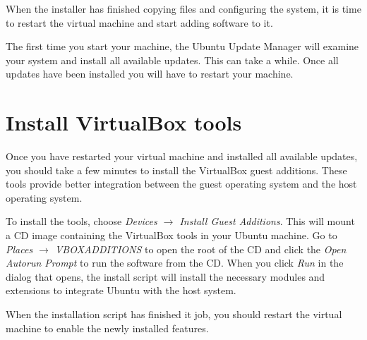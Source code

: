 \documentclass[draft,ebook,10pt,twoside,openright]{memoir}
\begin{document}

When the installer has finished copying files and configuring the system, it is time to restart the virtual machine and start adding software to it.

The first time you start your machine, the Ubuntu Update Manager will examine your system and install all available updates. This can take a while. Once all updates have been installed you will have to restart your machine.


\section{Install VirtualBox tools} \label{secinstallvirtualboxtools}

Once you have restarted your virtual machine and installed all available updates, you should take a few minutes to install the VirtualBox guest additions. These tools provide better integration between the guest operating system and the host operating system.

To install the tools, choose \emph{Devices $\rightarrow$ Install Guest Additions}. This will mount a CD image containing the VirtualBox tools in your Ubuntu machine. Go to \emph{Places $\rightarrow$ VBOXADDITIONS} to open the root of the CD and click the \emph{Open Autorun Prompt} to run the software from the CD. When you click \emph{Run} in the dialog that opens, the install script will install the necessary modules and extensions to integrate Ubuntu with the host system.

When the installation script has finished it job, you should restart the virtual machine to enable the newly installed features.


\end{document}
